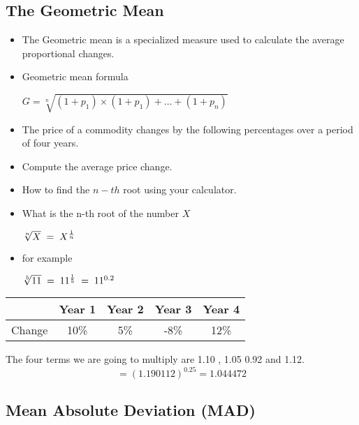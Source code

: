 \documentclass[]{report}
\begin{document}
	\subsection{The Geometric Mean}
	\begin{itemize}
		\item The Geometric mean is a specialized measure used to calculate the average proportional changes.
		
		\item  Geometric mean formula
		
		$G = \sqrt[n]{(1+p_1) \times (1+p_1) +  \ldots + (1+p_n)}$
		
		\item  The price of a commodity changes by the following percentages over a period of four years.
		\item  Compute the average price change.
		
		
		\item How to find the $n-th$ root using your calculator.
		\item  What is the n-th root of the number $X$
		
		$\sqrt[n]{X} \;= \; X^{1 \over n} $
		
		\item  for example
		
		$\sqrt[5]{11} \;= \; 11^{1 \over 5} \;= \; 11^{0.2} $
		
	\end{itemize}
	
	
	
	\begin{center}
		\begin{tabular}{|c|c|c|c|c|}
			\hline
			& Year 1 & Year 2 & Year 3 & Year 4\\ \hline
			Change  & 10\% &5\% &-8\% &12\% \\ \hline
		\end{tabular}
	\end{center}
	
	The four terms we are going to multiply are
	1.10 , 1.05 0.92 and 1.12.
	{
		\large
		\begin{equation}
		= (1.190112)^{0.25}
		= 1.044472
		\end{equation}
	}
	
	

	


	\subsection*{Mean Absolute Deviation (MAD)}
	
\end{document}
